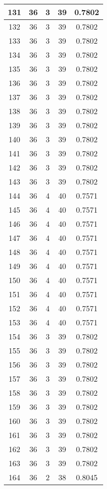 \documentclass[letterpaper, 12pt]{article}
\begin{document}
\begin{longtable}{|c|c|c|c|c|}
\hline
131 & 36 & 3 & 39 & 0.7802 \\
\hline
132 & 36 & 3 & 39 & 0.7802 \\
\hline
133 & 36 & 3 & 39 & 0.7802 \\
\hline
134 & 36 & 3 & 39 & 0.7802 \\
\hline
135 & 36 & 3 & 39 & 0.7802 \\
\hline
136 & 36 & 3 & 39 & 0.7802 \\
\hline
137 & 36 & 3 & 39 & 0.7802 \\
\hline
138 & 36 & 3 & 39 & 0.7802 \\
\hline
139 & 36 & 3 & 39 & 0.7802 \\
\hline
140 & 36 & 3 & 39 & 0.7802 \\
\hline
141 & 36 & 3 & 39 & 0.7802 \\
\hline
142 & 36 & 3 & 39 & 0.7802 \\
\hline
143 & 36 & 3 & 39 & 0.7802 \\
\hline
144 & 36 & 4 & 40 & 0.7571 \\
\hline
145 & 36 & 4 & 40 & 0.7571 \\
\hline
146 & 36 & 4 & 40 & 0.7571 \\
\hline
147 & 36 & 4 & 40 & 0.7571 \\
\hline
148 & 36 & 4 & 40 & 0.7571 \\
\hline
149 & 36 & 4 & 40 & 0.7571 \\
\hline
150 & 36 & 4 & 40 & 0.7571 \\
\hline
151 & 36 & 4 & 40 & 0.7571 \\
\hline
152 & 36 & 4 & 40 & 0.7571 \\
\hline
153 & 36 & 4 & 40 & 0.7571 \\
\hline
154 & 36 & 3 & 39 & 0.7802 \\
\hline
155 & 36 & 3 & 39 & 0.7802 \\
\hline
156 & 36 & 3 & 39 & 0.7802 \\
\hline
157 & 36 & 3 & 39 & 0.7802 \\
\hline
158 & 36 & 3 & 39 & 0.7802 \\
\hline
159 & 36 & 3 & 39 & 0.7802 \\
\hline
160 & 36 & 3 & 39 & 0.7802 \\
\hline
161 & 36 & 3 & 39 & 0.7802 \\
\hline
162 & 36 & 3 & 39 & 0.7802 \\
\hline
163 & 36 & 3 & 39 & 0.7802 \\
\hline
164 & 36 & 2 & 38 & 0.8045 \\

\end{longtable}
\end{document}
